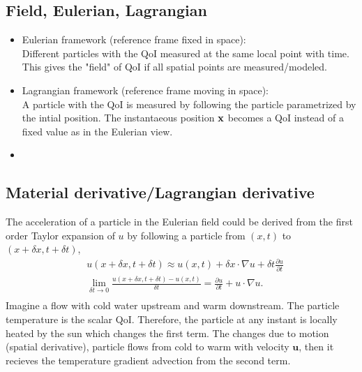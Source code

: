 \subsection{Field, Eulerian, Lagrangian}
\begin{itemize}
    \item Eulerian framework (reference frame fixed in space): \\
        Different particles with the QoI measured at the same local point with time.
        This gives the "field" of QoI if all spatial points are measured/modeled. 
    \item Lagrangian framework (reference frame moving in space): \\
        A particle with the QoI is measured by following the particle parametrized by the intial position.
        The instantaeous position $\bf{x}$ becomes a QoI instead of a fixed value as in the Eulerian view.
    \item
\end{itemize}

\subsection{Material derivative/Lagrangian derivative}
The acceleration of a particle in the Eulerian field could be derived from the 
first order Taylor expansion of $u$ by following a particle from $(x,t)$ to $(x+\delta x,t+\delta t)$,
\begin{equation}
    \begin{aligned}
        & u(x+\delta x, t+\delta t) \approx u(x,t) + \delta x \cdot\nabla u + \delta t \frac{\partial u}{\partial t} \\
        & \lim_{\delta t \to 0}\frac{u(x+\delta x, t+\delta t) - u(x,t)}{\delta t} = \frac{\partial u}{\partial t} + u
            \cdot \nabla u. \\
    \end{aligned}
\end{equation}
Imagine a flow with cold water upstream and warm downstream. 
The particle temperature is the scalar QoI. 
Therefore, the particle at any instant is locally heated by the sun which changes the first term.
The changes due to motion (spatial derivative), particle flows from cold to warm with velocity $\bm{u}$,
then it recieves the temperature gradient advection from the second term.

